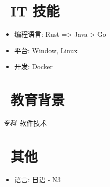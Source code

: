 \documentclass{resume}
\begin{document}

\section{\faCogs\ IT 技能}
\begin{itemize}[parsep=0.5ex]
  \item 编程语言: Rust => Java > Go
  \item 平台: Window, Linux
  \item 开发: Docker
\end{itemize}

\section{\faGraduationCap\  教育背景}
\textit{专科}\ 软件技术

\section{\faInfo\ 其他}
\begin{itemize}[parsep=0.5ex]
  \item 语言: 日语 - N3
\end{itemize}

%
%
\end{document}
